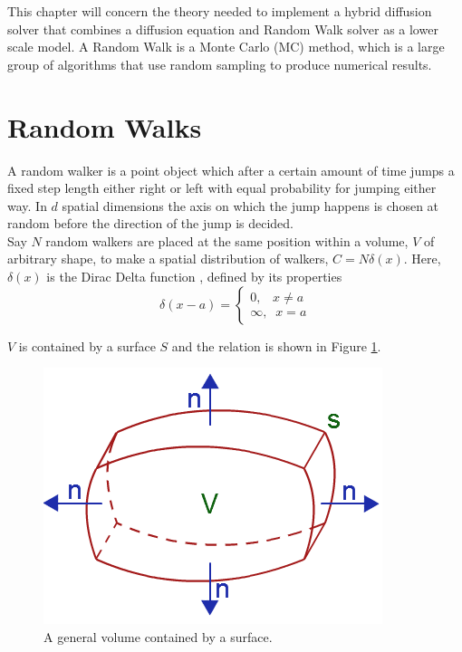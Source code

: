 This chapter will concern the theory needed to implement a hybrid diffusion solver that combines a diffusion equation and Random Walk solver as a lower scale model. 
A Random Walk is a Monte Carlo (MC) method, which is a large group of algorithms that use random sampling to produce numerical results. 



\section{Random Walks}
A random walker is a point object which after a certain amount of time jumps a fixed step length either right or left with equal probability for jumping either way. 
In $d$ spatial dimensions the axis on which the jump happens is chosen at random before the direction of the jump is decided. \\
Say $N$ random walkers are placed at the same position within a volume, $V$ of arbitrary shape, to make a spatial distribution of walkers, $C = N\delta(x)$. 
Here, $\delta(x)$ is the Dirac Delta function \cite{boas2006mathematical}, defined by its properties
\begin{equation}
 \delta(x-a) = \begin{cases}
              0 ,\;\;\; x\neq a\\
              \infty,\;\; x=a
             \end{cases}
\end{equation}

\noindent $V$ is contained by a surface $S$ and the relation is shown in Figure \ref{theory:divergence_theorem}. 

\begin{figure}[H]
\centering
\includegraphics[scale=0.6]{Figures/divergence_theorem.png}
 \caption{A general volume contained by a surface.}
 \label{theory:divergence_theorem}
\end{figure}

